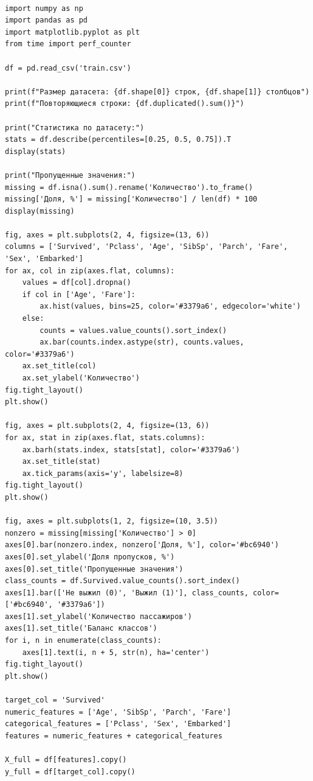 \documentclass[a4paper,12pt]{article}
\begin{document}
\begin{verbatim}

import numpy as np
import pandas as pd
import matplotlib.pyplot as plt
from time import perf_counter

df = pd.read_csv('train.csv')

print(f"Размер датасета: {df.shape[0]} строк, {df.shape[1]} столбцов")
print(f"Повторяющиеся строки: {df.duplicated().sum()}")

print("Статистика по датасету:")
stats = df.describe(percentiles=[0.25, 0.5, 0.75]).T
display(stats)

print("Пропущенные значения:")
missing = df.isna().sum().rename('Количество').to_frame()
missing['Доля, %'] = missing['Количество'] / len(df) * 100
display(missing)

fig, axes = plt.subplots(2, 4, figsize=(13, 6))
columns = ['Survived', 'Pclass', 'Age', 'SibSp', 'Parch', 'Fare', 'Sex', 'Embarked']
for ax, col in zip(axes.flat, columns):
    values = df[col].dropna()
    if col in ['Age', 'Fare']:
        ax.hist(values, bins=25, color='#3379a6', edgecolor='white')
    else:
        counts = values.value_counts().sort_index()
        ax.bar(counts.index.astype(str), counts.values, color='#3379a6')
    ax.set_title(col)
    ax.set_ylabel('Количество')
fig.tight_layout()
plt.show()

fig, axes = plt.subplots(2, 4, figsize=(13, 6))
for ax, stat in zip(axes.flat, stats.columns):
    ax.barh(stats.index, stats[stat], color='#3379a6')
    ax.set_title(stat)
    ax.tick_params(axis='y', labelsize=8)
fig.tight_layout()
plt.show()

fig, axes = plt.subplots(1, 2, figsize=(10, 3.5))
nonzero = missing[missing['Количество'] > 0]
axes[0].bar(nonzero.index, nonzero['Доля, %'], color='#bc6940')
axes[0].set_ylabel('Доля пропусков, %')
axes[0].set_title('Пропущенные значения')
class_counts = df.Survived.value_counts().sort_index()
axes[1].bar(['Не выжил (0)', 'Выжил (1)'], class_counts, color=['#bc6940', '#3379a6'])
axes[1].set_ylabel('Количество пассажиров')
axes[1].set_title('Баланс классов')
for i, n in enumerate(class_counts):
    axes[1].text(i, n + 5, str(n), ha='center')
fig.tight_layout()
plt.show()

target_col = 'Survived'
numeric_features = ['Age', 'SibSp', 'Parch', 'Fare']
categorical_features = ['Pclass', 'Sex', 'Embarked']
features = numeric_features + categorical_features

X_full = df[features].copy()
y_full = df[target_col].copy()


\end{verbatim}
\end{document}
